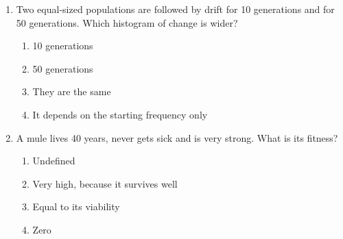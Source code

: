 \documentclass[11pt]{article}
\begin{document}
\begin{enumerate}[label=\textbf{\arabic*.}, leftmargin=2em, itemsep=1.4em]
\begin{tabularx}{\linewidth}{@{}YY@{}}
\(q'\) becomes 3 times smaller & \(q'\) becomes 3 times larger \\
\end{tabularx}
\item Two equal-sized populations are followed by drift for 10 generations and for 50 generations. Which histogram of change is wider?
\par\smallskip
\begin{enumerate}[label={}, leftmargin=2.4em, labelwidth=0pt, itemsep=2pt, topsep=0pt]
\item \hspace*{-2.4em}10 generations
\item \hspace*{-2.4em}50 generations
\item \hspace*{-2.4em}They are the same
\item \hspace*{-2.4em}It depends on the starting frequency only
\end{enumerate}
\item A mule lives 40 years, never gets sick and is very strong. What is its fitness?
\par\smallskip
\begin{enumerate}[label={}, leftmargin=2.4em, labelwidth=0pt, itemsep=2pt, topsep=0pt]
\item \hspace*{-2.4em}Undefined
\item \hspace*{-2.4em}Very high, because it survives well
\item \hspace*{-2.4em}Equal to its viability
\item \hspace*{-2.4em}Zero
\end{enumerate}
\end{enumerate}
\end{document}
